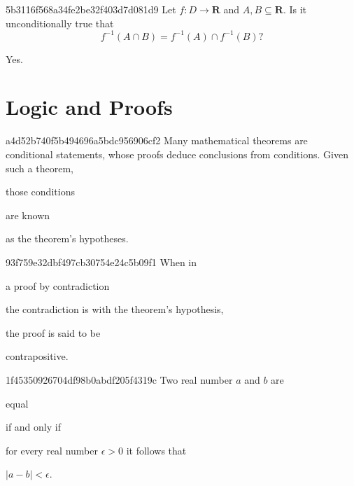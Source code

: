 \begin{note}{5b3116f568a34fe2be32f403d7d081d9}
    Let \({ f : D \to \mathbf{R} }\) and \({ A, B \subseteq \mathbf{R} }\).
    Is it unconditionally true that
    \[
        f^{-1}(A \cap B) = f^{-1}(A) \cap f^{-1}(B)?
    \]

    \begin{cloze}{1}
        Yes.
    \end{cloze}
\end{note}

\section{Logic and Proofs}
\begin{note}{a4d52b740f5b494696a5bdc956906cf2}
    Many mathematical theorems are conditional statements, whose proofs deduce conclusions from conditions. Given such a theorem, \begin{icloze}{1}those conditions\end{icloze} are known \begin{icloze}{2}as the theorem's hypotheses.\end{icloze}
\end{note}

\begin{note}{93f759e32dbf497cb30754e24c5b09f1}
    When in \begin{icloze}{3}a proof by contradiction\end{icloze} \begin{icloze}{2}the contradiction is with the theorem's hypothesis,\end{icloze} the proof is said to be \begin{icloze}{1}contrapositive.\end{icloze}
\end{note}

\begin{note}{1f45350926704df98b0abdf205f4319c}
    Two real number \({ a }\) and \({ b }\) are \begin{icloze}{4}equal\end{icloze} \begin{icloze}{3}if and only if\end{icloze} \begin{icloze}{2}for every real number \({ \epsilon > 0 }\) it follows that\end{icloze} \begin{icloze}{1}\({ \left\lvert a - b \right\rvert < \epsilon }\).\end{icloze}
\end{note}


